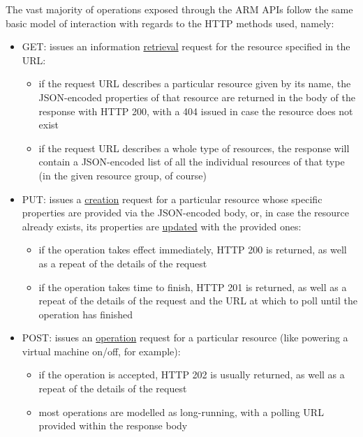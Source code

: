 \documentclass[11pt]{report}
\begin{document}
The vast majority of operations exposed through the ARM APIs follow the same
basic model of interaction with regards to the HTTP methods used, namely:

\begin{itemize}
    \item{GET}: issues an information \ul{retrieval} request for the resource
        specified in the URL:
        \begin{itemize}
            \item{} if the request URL describes a particular resource given by
                its name, the JSON-encoded properties of that resource are
                returned in the body of the response with HTTP 200, with a 404
                issued in case the resource does not exist
            \item{} if the request URL describes a whole type of resources, the
                response will contain a JSON-encoded list of all the individual
                resources of that type (in the given resource group, of course)
        \end{itemize}
    \item{PUT}: issues a \ul{creation} request for a particular resource whose
        specific properties are provided via the JSON-encoded body, or, in case
        the resource already exists, its properties are \ul{updated} with the
        provided ones:
        \begin{itemize}
            \item{} if the operation takes effect immediately, HTTP 200 is
                returned, as well as a repeat of the details of the request
            \item{} if the operation takes time to finish, HTTP 201 is
                returned, as well as a repeat of the details of the request and
                the URL at which to poll until the operation has finished
        \end{itemize}
    \item{POST}: issues an \ul{operation} request for a particular resource
        (like powering a virtual machine on/off, for example):
        \begin{itemize}
            \item{} if the operation is accepted, HTTP 202 is usually returned,
                as well as a repeat of the details of the request
            \item{} most operations are modelled as long-running, with a polling
                URL provided within the response body

\end{itemize}
\end{itemize}
\end{document}
